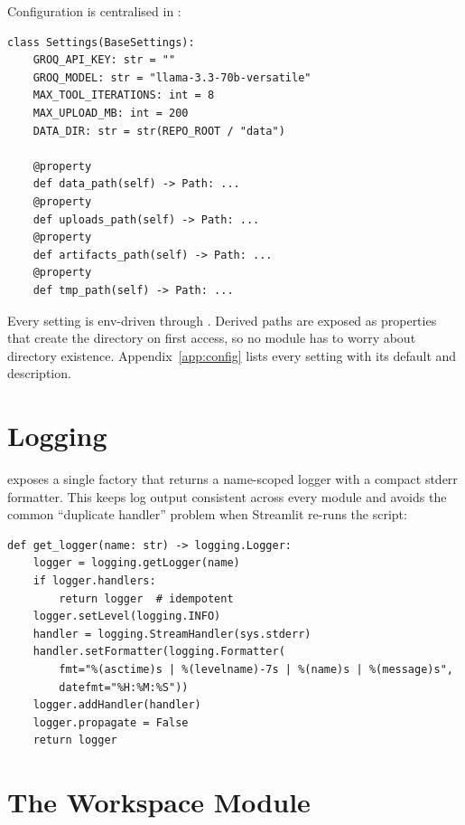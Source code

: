 Configuration is centralised in :

\begin{lstlisting}[caption={\file{core/config.py} (extract).},
                    label={lst:config}]
class Settings(BaseSettings):
    GROQ_API_KEY: str = ""
    GROQ_MODEL: str = "llama-3.3-70b-versatile"
    MAX_TOOL_ITERATIONS: int = 8
    MAX_UPLOAD_MB: int = 200
    DATA_DIR: str = str(REPO_ROOT / "data")

    @property
    def data_path(self) -> Path: ...
    @property
    def uploads_path(self) -> Path: ...
    @property
    def artifacts_path(self) -> Path: ...
    @property
    def tmp_path(self) -> Path: ...
\end{lstlisting}

Every setting is env-driven through 
\citep{pydantic}. Derived paths are exposed as properties that
create the directory on first access, so no module has to worry
about directory existence. Appendix~\ref{app:config} lists every
setting with its default and description.

\section{Logging}
\label{sec:logging}

 exposes a single 
factory that returns a name-scoped logger with a compact stderr
formatter. This keeps log output consistent across every module and
avoids the common ``duplicate handler'' problem when Streamlit
re-runs the script:

\begin{lstlisting}[caption={\file{core/logger.py}.},label={lst:logger}]
def get_logger(name: str) -> logging.Logger:
    logger = logging.getLogger(name)
    if logger.handlers:
        return logger  # idempotent
    logger.setLevel(logging.INFO)
    handler = logging.StreamHandler(sys.stderr)
    handler.setFormatter(logging.Formatter(
        fmt="%(asctime)s | %(levelname)-7s | %(name)s | %(message)s",
        datefmt="%H:%M:%S"))
    logger.addHandler(handler)
    logger.propagate = False
    return logger
\end{lstlisting}

\section{The Workspace Module}
\label{sec:workspace}

